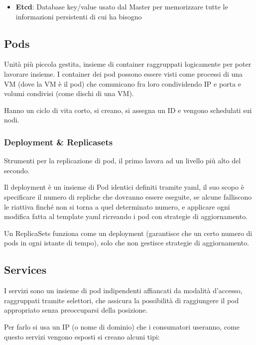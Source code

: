 \begin{itemize}
\item
  \textbf{Etcd}: Database key/value usato dal Master per memorizzare
  tutte le informazioni persistenti di cui ha bisogno
\end{itemize}

\subsection{Pods}\label{pods}

Unità più piccola gestita, insieme di container raggruppati logicamente
per poter lavorare insieme. I container dei pod possono essere visti
come processi di una VM (dove la VM è il pod) che comunicano fra loro
condividendo IP e porta e volumi condivisi (come dischi di una VM).

Hanno un ciclo di vita corto, si creano, si assegna un ID e vengono
schedulati sui nodi.

\subsubsection{Deployment \& Replicasets}\label{deployment-replicasets}

Strumenti per la replicazione di pod, il primo lavora ad un livello più
alto del secondo.

Il deployment è un insieme di Pod identici definiti tramite yaml, il suo
scopo è specificare il numero di repliche che dovranno essere eseguite,
se alcune falliscono le riattiva finché non si torna a quel determinato
numero, e applicare ogni modifica fatta al template yaml ricreando i pod
con strategie di aggiornamento.

Un ReplicaSets funziona come un deployment (garantisce che un certo
numero di pods in ogni istante di tempo), solo che non gestisce
strategie di aggiornamento.

\subsection{Services}\label{services}

I servizi sono un insieme di pod indipendenti affiancati da modalità
d'accesso, raggruppati tramite selettori, che assicura la possibilità di
raggiungere il pod appropriato senza preoccuparsi della posizione.

Per farlo si usa un IP (o nome di dominio) che i consumatori useranno,
come questo servizi vengono esposti si creano alcuni tipi:

